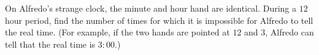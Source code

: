 On Alfredo's strange clock, the minute and hour hand are identical. During a $12$ hour period, find the number of times for which it is impossible for Alfredo to tell the real time. (For example, if the two hands are pointed at $12$ and $3$, Alfredo can tell that the real time is $3:00$.)
